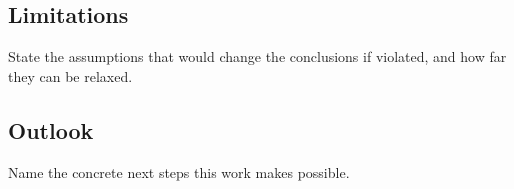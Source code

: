 \documentclass[12pt,a4paper]{article}
\begin{document}
\subsection{Limitations}

State the assumptions that would change the conclusions if violated, and how far
they can be relaxed.

\subsection{Outlook}

Name the concrete next steps this work makes possible.


\newpage\clearpage

\renewcommand\refname{References}


\newpage
\end{document}
